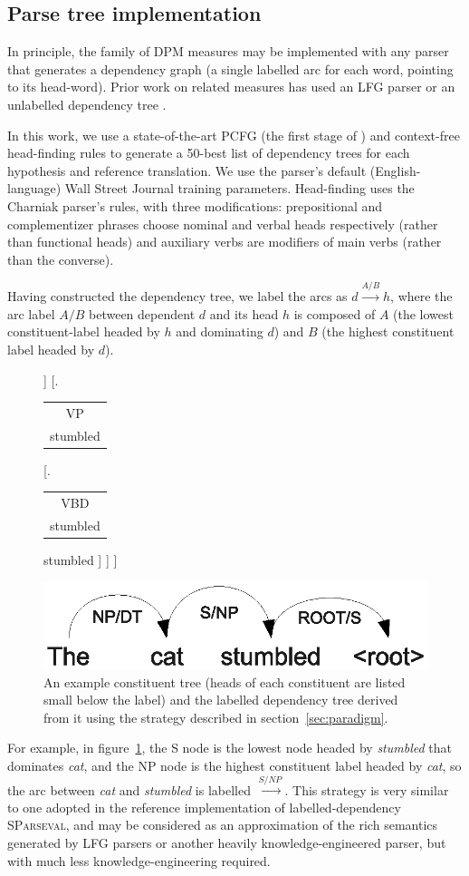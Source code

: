 \documentclass{kluwer}    %
\newcommand{\headlabel}[2]{
  \begin{tabular}{c} #1\\
    {\small #2} \end{tabular}}
\newcommand{\arclabel}[1]{\ensuremath{\stackrel{#1}{\to}}}
\begin{document}
\begin{article}
\subsection{Parse tree implementation}
In principle, the family of DPM measures may be implemented with
any parser that generates a dependency graph (a single labelled arc
for each word, pointing to its head-word). Prior work
\cite{owczarzak07labelleddepseval} on related
measures has used an LFG parser \cite{cahill04lfg} or
an unlabelled dependency tree \cite{liu05syntaxformteval}. 

In this work, we use a state-of-the-art PCFG (the first stage of
) and context-free head-finding rules
\cite{magerman95headfinding} to generate a 50-best list of dependency
trees for each hypothesis and reference translation.  We use the
parser's default (English-language) Wall Street Journal training
parameters.  Head-finding uses the Charniak parser's rules, with three
modifications: prepositional and complementizer phrases choose nominal
and verbal heads respectively (rather than functional heads) and
auxiliary verbs are modifiers of main verbs (rather than the
converse).

Having constructed the dependency tree, we label the arcs as $d
\stackrel{A/B}{\to} h$, where the arc label $A/B$ between dependent
$d$ and its head $h$ is composed of $A$ (the lowest constituent-label
headed by $h$ and dominating $d$) and $B$ (the highest constituent
label headed by $d$). 
\begin{figure}
  \Tree
  [.\headlabel{S}{stumbled}
    [.\headlabel{NP}{cat}
      [.\headlabel{DT}{the} the ]
      [.\headlabel{NN}{cat} cat ]
    ]
    [.\headlabel{VP}{stumbled} 
      [.\headlabel{VBD}{stumbled} stumbled ]
    ]
  ]
  \\
  \begin{center}
    \includegraphics[scale=0.6]{dpm-example-depextract.eps}
  \end{center}
  \caption{An example constituent tree (heads of each constituent are
    listed small below the label) and the labelled dependency tree
    derived from it using the strategy described in
    section~\ref{sec:paradigm}.}
  \label{fig:depextract}
\end{figure}
For example, in figure~\ref{fig:depextract}, the S node is the
lowest node headed by \emph{stumbled} that dominates \emph{cat}, and
the NP node is the highest constituent label headed by \emph{cat}, so
the arc between \emph{cat} and \emph{stumbled} is labelled \arclabel{S/NP}.
%
This strategy is very similar to one adopted in the reference
implementation of labelled-dependency \textsc{SParseval}, and may be
considered as an approximation of the rich semantics generated by LFG
parsers \cite{cahill04lfg} or another heavily knowledge-engineered
parser, but with much less knowledge-engineering required.


\end{article}
\end{document}
